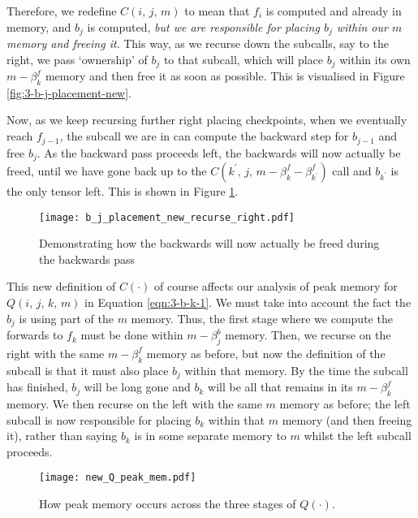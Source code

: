 Therefore, we redefine \(C(i,\,j,\,m)\) to mean that \(f_i\) is computed and already in memory, and \(b_j\) is computed, \textit{but we are responsible for placing \(b_j\) within our \(m\) memory and freeing it}.
This way, as we recurse down the subcalls, say to the right, we pass `ownership' of \(b_j\) to that subcall, which will place \(b_j\) within its own \(m-\beta^f_k\) memory and then free it as soon as possible.
This is visualised in Figure \ref{fig:3-b-j-placement-new}.

Now, as we keep recursing further right placing checkpoints, when we eventually reach \(f_{j-1}\), the subcall we are in can compute the backward step for \(b_{j-1}\) and free \(b_j\).
As the backward pass proceeds left, the backwards will now actually be freed, until we have gone back up to the \(C(k^\prime,\, j,\, m-\beta^f_k -\beta^f_{k^\prime})\) call and \(b_{k^\prime}\) is the only tensor left.
This is shown in Figure \ref{fig:3-b-j-placement-new-right}.
\begin{figure}[h]
    \centering
    \texttt{[image: b\_j\_placement\_new\_recurse\_right.pdf]}
    \caption{Demonstrating how the backwards will now actually be freed during the backwards pass}
    \label{fig:3-b-j-placement-new-right}
\end{figure}

This new definition of \(C(\cdot)\) of course affects our analysis of peak memory for \(Q(i,\,j,\,k,\,m)\) in Equation \ref{eqn:3-b-k-1}.
We must take into account the fact the \(b_j\) is using part of the \(m\) memory.
Thus, the first stage where we compute the forwards to \(f_k\) must be done within \(m-\beta^b_j\) memory.
Then, we recurse on the right with the same \(m-\beta^f_k\) memory as before, but now the definition of the subcall is that it must also place \(b_j\) within that memory.
By the time the subcall has finished, \(b_j\) will be long gone and \(b_k\) will be all that remains in its \(m-\beta^f_k\) memory.
We then recurse on the left with the same \(m\) memory as before;
the left subcall is now responsible for placing \(b_k\) within that \(m\) memory (and then freeing it), rather than saying \(b_k\) is in some separate memory to \(m\) whilst the left subcall proceeds.
\begin{figure}[h]
    \centering
    \texttt{[image: new\_Q\_peak\_mem.pdf]}
    \caption{How peak memory occurs across the three stages of \(Q(\cdot)\).}
    \label{fig:3-new-Q-peak-mem}
\end{figure}

